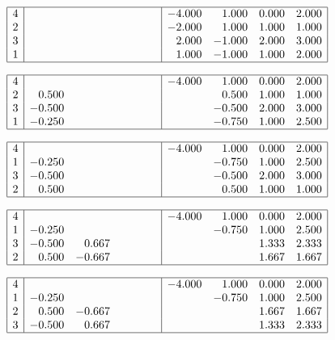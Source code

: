 \documentclass[11pt]{article}
\newcommand{\1}{\mathbf{1}}
\newcommand{\0}{\mathbf{0}}
\begin{document}
\[
\begin{array}{|r|rrr|rrrr|}
\hline
  4	& \phantom{-0.000}&\phantom{-0.000}&\phantom{-0.000}& -4.000	&  1.000	&  0.000	&  2.000 \\
  2	& 		&  		&		& -2.000	&  1.000	&  1.000	&  1.000 \\
  3	& 		& 		&  		&  2.000	& -1.000	&  2.000	&  3.000 \\
  1	& 	 	& 		& 		&  1.000	& -1.000	&  1.000	&  2.000 \\
\hline
\end{array}
\]

\[
\begin{array}{|r|rrr|rrrr|}
\hline
  4	& \phantom{-0.000}&\phantom{-0.000}&\phantom{-0.000}& -4.000	&  1.000	&  0.000	&  2.000 \\
  2	&  0.500	&  		&		& 		&  0.500	&  1.000	&  1.000 \\
  3	& -0.500	& 		&  		& 		& -0.500	&  2.000	&  3.000 \\
  1	& -0.250 	& 		& 		& 		& -0.750	&  1.000	&  2.500 \\
\hline
\end{array}
\]

\[
\begin{array}{|r|rrr|rrrr|}
\hline
  4	& \phantom{-0.000}&\phantom{-0.000}&\phantom{-0.000}& -4.000	&  1.000	&  0.000	&  2.000 \\
  1	& -0.250	&  		&		& 		& -0.750	&  1.000	&  2.500 \\
  3	& -0.500	& 		&  		& 		& -0.500	&  2.000	&  3.000 \\
  2	&  0.500 	& 		& 		& 		&  0.500	&  1.000	&  1.000 \\
\hline
\end{array}
\]

\[
\begin{array}{|r|rrr|rrrr|}
\hline
  4	& \phantom{-0.000}&\phantom{-0.000}&\phantom{-0.000}& -4.000	&  1.000	&  0.000	&  2.000 \\
  1	& -0.250	&  		&		& 		& -0.750	&  1.000	&  2.500 \\
  3	& -0.500	&  0.667	&  		& 		& 		&  1.333	&  2.333 \\
  2	&  0.500 	& -0.667	& 		& 		& 		&  1.667	&  1.667 \\
\hline
\end{array}
\]

\[
\begin{array}{|r|rrr|rrrr|}
\hline
  4	& \phantom{-0.000}&\phantom{-0.000}&\phantom{-0.000}& -4.000	&  1.000	&  0.000	&  2.000 \\
  1	& -0.250	&  		&		& 		& -0.750	&  1.000	&  2.500 \\
  2	&  0.500 	& -0.667	& 		& 		& 		&  1.667	&  1.667 \\
  3	& -0.500	&  0.667	& 		& 		& 		&  1.333	&  2.333 \\
\hline
\end{array}
\]
\end{document}
